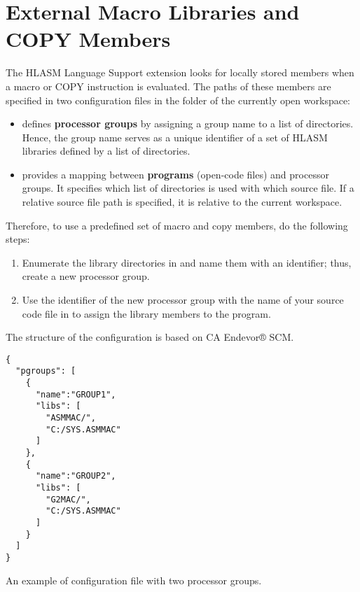 \section{External Macro Libraries and COPY Members}
\label{sec:configuration}

The HLASM Language Support extension looks for locally stored members when a macro or COPY instruction is evaluated. The paths of these members are specified in two configuration files in the  folder of the currently open workspace:
\begin{itemize}
	\item  {} defines \textbf{processor groups} by assigning a group name to a list of directories. Hence, the group name serves as a unique identifier of a set of HLASM libraries defined by a list of directories.
	
	
	\item  {} provides a mapping between \textbf{programs} (open-code files) and processor groups. It specifies which list of directories is used with which source file. If a relative source file path is specified, it is relative to the current workspace.
\end{itemize}

Therefore, to use a predefined set of macro and copy members, do the following steps: 
\begin{enumerate}
	\item Enumerate the library directories in  and name them with an identifier; thus, create a new processor group.
	\item Use the identifier of the new processor group with the name of your source code file in  to assign the library members to the program.
\end{enumerate}

The structure of the configuration is based on CA Endevor® SCM.


\begin{listing}
	\begin{verbatim}
{
  "pgroups": [
    {
      "name":"GROUP1",
      "libs": [
        "ASMMAC/",
        "C:/SYS.ASMMAC"
      ]
    },
    {
      "name":"GROUP2",
      "libs": [
        "G2MAC/",
        "C:/SYS.ASMMAC"
      ]
    }
  ]
}
	\end{verbatim}
	\caption{An example of  configuration file with two processor groups.}
	\label{lst:ex1}
\end{listing}

